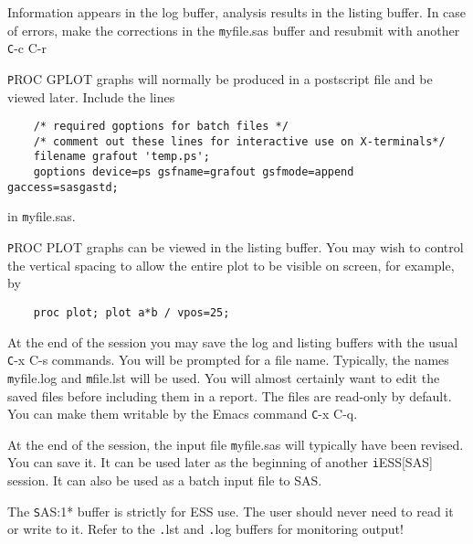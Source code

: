 \documentclass{article}
\begin{document}
Information appears in the log buffer, analysis results in the
listing buffer.  In case of errors, make the corrections in the
{\texttt myfile.sas} buffer and resubmit with another {\texttt C-c C-r}

{\texttt PROC GPLOT} graphs will normally be produced in a postscript
file and be viewed later.  Include the lines
{\small
\begin{verbatim}
    /* required goptions for batch files */
    /* comment out these lines for interactive use on X-terminals*/
    filename grafout 'temp.ps';
    goptions device=ps gsfname=grafout gsfmode=append gaccess=sasgastd;
\end{verbatim}
}
\noindent
in {\texttt myfile.sas}.

 {\texttt PROC PLOT} graphs can be viewed in the listing buffer.  You may
 wish to control the vertical spacing to allow the entire plot
 to be visible on screen, for example, by
\begin{verbatim}
    proc plot; plot a*b / vpos=25;
\end{verbatim}

 At the end of the session you may save the log and listing
 buffers with the usual {\texttt C-x C-s} commands.  You will be prompted
 for a file name.  Typically, the names {\texttt myfile.log} and {\texttt mfile.lst}
 will be used.  You will almost certainly want to edit the saved
 files before including them in a report.  The files are
 read-only by default.  You can make them writable by the Emacs
 command {\texttt C-x C-q}.

 At the end of the session, the input file {\texttt myfile.sas} will
 typically have been revised.  You can save it.  It can be used
 later as the beginning of another {\texttt iESS[SAS]} session.  It can
 also be used as a batch input file to SAS.
 
 The {\texttt *SAS:1*} buffer is strictly for ESS use.  The user
 should never need to read it or write to it.  Refer to the {\texttt
   .lst} and {\texttt .log} buffers for monitoring output!


\end{document}
